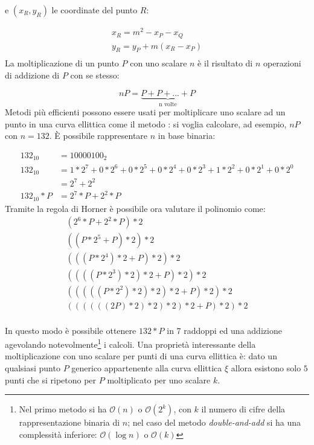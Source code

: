 e $(x_R,y_R)$ le coordinate del punto $R$:

\begin{equation}
    \begin{split}
        x_R = m^2 - x_P - x_Q\\
        y_R = y_P + m(x_R - x_P)\\
    \end{split}
\end{equation}\newline\newline
La moltiplicazione di un punto $P$ con uno scalare $n$ è il risultato di $n$ operazioni di addizione di $P$ con se stesso:

\begin{equation}
    nP = \underbrace{P + P + ... + P}_\text{n volte}
\end{equation}
Metodi più efficienti possono essere usati per moltiplicare uno scalare ad un punto in una curva ellittica come il metodo : si voglia calcolare, ad esempio, $nP$ con $n = 132$.
È possibile rappresentare $n$ in base binaria:

\begin{equation}
    \begin{split}
        132_{10} & = 10000100_2\\
        132_{10} & = 1* 2^7 + 0 * 2^6 + 0 * 2^5 + 0 * 2^4 + 0 * 2^3 + 1 * 2^2 + 0 * 2^1 + 0 * 2^0\\
                 & = 2^7 + 2^2\\
        132_{10} * P & = 2^7 * P + 2^2 * P
    \end{split}
\end{equation}
Tramite la regola di Horner è possibile ora valutare il polinomio come:
\begin{equation}
    \begin{split}
        (2^6*P + 2^2*P)*2\\
        ((P * 2^5 + P)*2)*2\\
        (((P * 2^4)*2 + P)*2)*2\\
        ((((P * 2^3)*2)*2 + P)*2)*2\\
        (((((P * 2^2)*2)*2)*2 + P)*2)*2\\
        ((((((2P)*2)*2)*2)*2 + P)*2)*2\\
    \end{split}
\end{equation}

In questo modo è possibile ottenere $132*P$ in 7 raddoppi ed una addizione agevolando notevolmente\footnote{Nel primo metodo si ha $\mathcal{O}(n)$ o $\mathcal{O}(2^k)$, con $k$ il numero di cifre della rappresentazione binaria di $n$; nel caso del metodo \textit{double-and-add} si ha una complessità inferiore: $\mathcal{O}(\log{}n)$ o $\mathcal{O}(k)$} i calcoli.\newline
Una proprietà interessante della moltiplicazione con uno scalare per punti di una curva ellittica è: dato un qualsiasi punto $P$ generico appartenente alla curva ellittica $\xi$ allora esistono solo $5$ punti che si ripetono per $P$ moltiplicato per uno scalare $k$.

